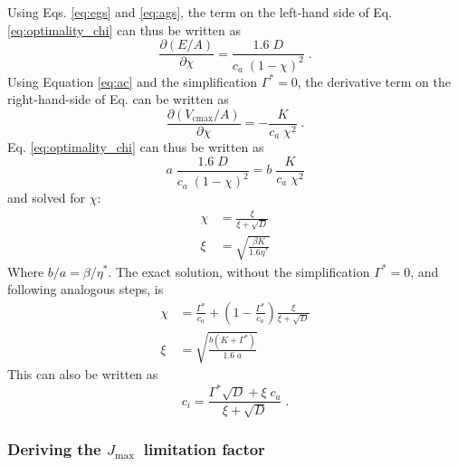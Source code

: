 \documentclass{myreport}
\newcommand{\jmax}{$J_{\text{max}}$}
\begin{document}
Using Eqs. \ref{eq:egs} and \ref{eq:ags}, the term on the left-hand side of Eq. \ref{eq:optimality_chi} can thus be written as
\begin{equation}
\label{eq:partial1}
    \frac{\partial (E/A)}{\partial \chi} = \frac{1.6\;D}{c_a\;(1-\chi)^2}\;.
\end{equation}
Using Equation \ref{eq:ac} and the simplification $\Gamma^{\ast}=0$, the derivative term on the right-hand-side of Eq.\label{eq:optimality_chi} can be written as
\begin{equation}
\label{eq:partial2}
    \frac{\partial (V_{\mathrm{cmax}}/A)}{\partial \chi} = - \frac{K}{c_a\;\chi^2}\;.
\end{equation}
Eq. \ref{eq:optimality_chi} can thus be written as
\begin{equation}
    a\;\frac{1.6\;D}{c_a\;(1-\chi)^2} = b\;\frac{K}{c_a\;\chi^2}
\end{equation}
and solved for $\chi$:
\begin{align}
    \chi &= \frac{\xi}{\xi + \sqrt{D}} \\ 
    \xi &= \sqrt{\frac{\beta K}{1.6 \eta^\ast}}
\end{align}
Where $b/a=\beta/\eta^\ast$. The exact solution, without the simplification $\Gamma^{\ast}=0$, and following analogous steps, is 
\begin{align}
\label{eq:chi_exact}
    \chi &= \frac{\Gamma^{\ast}}{c_a} + \left(1- \frac{\Gamma^{\ast}}{c_a}\right)\frac{\xi}{\xi + \sqrt{D}}\\
    \xi &= \sqrt{\frac{b(K+\Gamma^{\ast})}{1.6\;a}}
\end{align}
This can also be written as
\begin{equation}
\label{eq:ci}
    c_i = \frac{\Gamma^{\ast}\sqrt{D}+ \xi\;c_a}{\xi + \sqrt{D}} \;. 
\end{equation}

\subsubsection{Deriving the \jmax\ limitation factor}
\label{sec:steps_jmaxlim}
\end{document}
